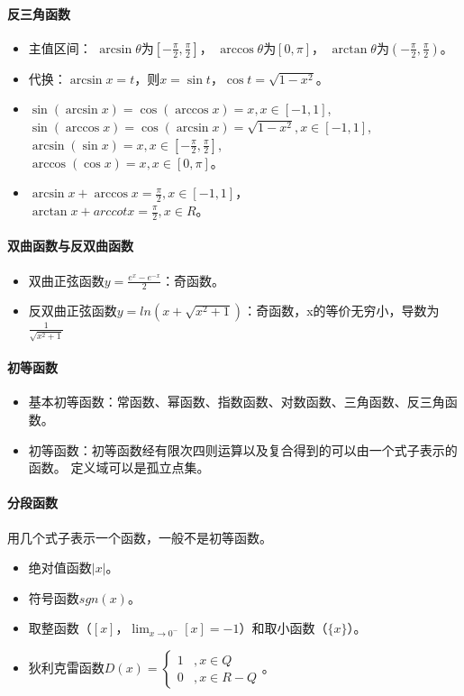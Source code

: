 \documentclass[
12pt, %
a4paper, 
oneside, %
headinclude,footinclude, %
]{scrartcl}
\begin{document}
\paragraph{反三角函数}
\begin{itemize}
\item 主值区间：
$ \arcsin\theta $为$ [-\frac{\pi}{2}, \frac{\pi}{2}] $，
$ \arccos\theta $为$ [0, \pi] $，
$ \arctan\theta $为$ (-\frac{\pi}{2}, \frac{\pi}{2}) $。
\item 代换：$ \arcsin x = t $，则$ x = \sin t $，$ \cos t = \sqrt{1 - x^2} $。
\item $ \sin(\arcsin x) = \cos(\arccos x) = x, x \in [-1, 1]$, \\
$ \sin(\arccos x) = \cos(\arcsin x) = \sqrt{1 - x^2}, x \in [-1, 1]$, \\
$ \arcsin(\sin x) =x, x \in [-\frac{\pi}{2}, \frac{\pi}{2}] $, \\
$ \arccos(\cos x) =x, x \in [0, \pi] $。
\item $ \arcsin x + \arccos x = \frac{\pi}{2}, x \in [-1, 1] $， \\
$ \arctan x + arccot x = \frac{\pi}{2}, x \in R $。
\end{itemize}
\paragraph{双曲函数与反双曲函数}
\begin{itemize}
\item 双曲正弦函数$ y = \frac{e^x - e^{-x}}{2} $：奇函数。
\item 反双曲正弦函数$ y = ln(x + \sqrt{x^2 + 1}) $：奇函数，x的等价无穷小，导数为$ \frac{1}{\sqrt{x^2 + 1}} $
\end{itemize}
\paragraph{初等函数}
\begin{itemize}
\item 基本初等函数：常函数、幂函数、指数函数、对数函数、三角函数、反三角函数。
\item 初等函数：初等函数经有限次四则运算以及复合得到的可以由一个式子表示的函数。
定义域可以是孤立点集。
\end{itemize}
\paragraph{分段函数}
用几个式子表示一个函数，一般不是初等函数。
\begin{itemize}
\item 绝对值函数$ |x| $。
\item 符号函数$ sgn(x) $。
\item 取整函数（$ [x] $，$ \lim_{x \to 0^-} [x] = -1 $）和取小函数（$ \{x\} $）。
\item 狄利克雷函数$ D(x)= \begin{cases} 1 &, x \in Q \\ 0 &, x \in R-Q \end{cases} $。
\end{itemize}
\end{document}
